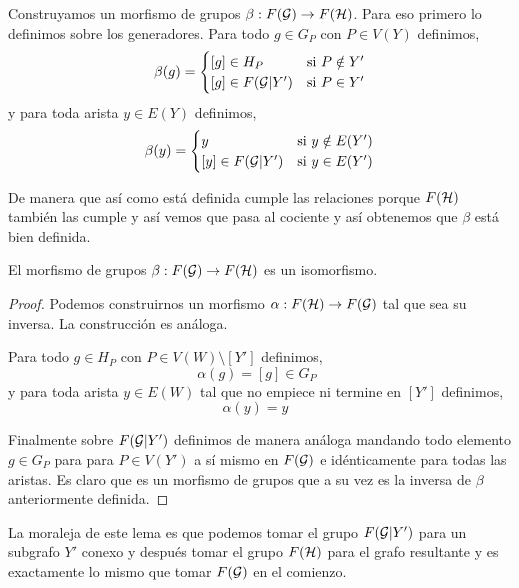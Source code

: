\documentclass[tesis.tex]{subfiles}
\begin{document}
Construyamos un morfismo de grupos $\beta:F({\cal G}) \to F({\cal H})$.
Para eso primero lo definimos sobre los generadores.
Para todo $g \in G_P$ con $P \in V(Y)$ definimos,
\begin{equation*}
	\beta(g) = 
	\begin{cases}
		[g] \in H_P & \text{si} \ P \notin Y' \\
		[g] \in F({\cal G} | Y') & \text{si} \ P \in Y'  \\ 
	\end{cases}
\end{equation*}
y para toda arista $ y \in E(Y)$ definimos,
\begin{equation*}
	\beta(y) = 
	\begin{cases}
		y  & \text{si} \ y \notin E(Y') \\
		[y] \in F({\cal G} | Y') & \text{si} \ y \in E(Y')  \\ 
	\end{cases}
\end{equation*}

De manera que así como está definida cumple las relaciones porque $F({\cal H})$ también las cumple y así vemos que pasa al cociente y así obtenemos que $\beta$ está bien definida.

\begin{lema}
	El morfismo de grupos $\beta:F({\cal G}) \to F({\cal H})$ es un isomorfismo. 
\end{lema}
\begin{proof}
	Podemos construirnos un morfismo $\alpha:F({\cal H}) \to F({\cal G})$ tal que sea su inversa.
	La construcción es análoga.
	
	Para todo $g \in H_P$ con $P \in V(W) \setminus [Y'] $ definimos,
	\begin{equation*}
		\alpha(g) = [g] \in G_P \ \ 
	\end{equation*}
	y para toda arista $ y \in E(W)$ tal que no empiece ni termine en $[Y']$ definimos,
	\begin{equation*}
		\alpha(y) = y  \ \ \ 
	\end{equation*}
	
	Finalmente sobre $F({\cal G} | Y')$ definimos de manera análoga mandando todo elemento $g \in G_P$ para para $P \in V(Y')$ a sí mismo en $F({\cal G})$ e idénticamente para todas las aristas.
	Es claro que es un morfismo de grupos que a su vez es la inversa de $\beta$ anteriormente definida.
\end{proof}

La moraleja de este lema es que podemos tomar el grupo $F({\cal G} | Y')$ para un subgrafo $Y'$ conexo y después tomar el grupo $F({\cal H})$ para el grafo resultante y es exactamente lo mismo que tomar $F({\cal G})$ en el comienzo.
\end{document}
